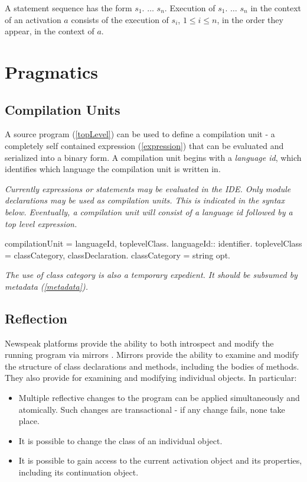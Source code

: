 \documentclass{article}
\begin{document}
A statement sequence has the form $s_1.$ $\ldots$ $ s_n$. Execution of  $s_1.$ $\ldots$ $ s_n$ in the context of an activation $a$  consists of the execution of $s_i$,  $1 \le i \le n$, in the order they appear,  in the context of $a$. 

\section{Pragmatics}

\subsection{Compilation Units}

A source program  (\ref{topLevel}) can be used to define a compilation unit - a completely self contained expression  (\ref{expression})  that can be evaluated and serialized into a binary form. A compilation unit begins with a {\em language id}, which identifies which language the compilation unit is written in.

{\it
Currently expressions or statements may be evaluated in the IDE. Only module declarations may be used as compilation units. This is indicated in the syntax below. Eventually, a compilation unit will consist of a language id followed by a top level expression.
}

\begin{newspeak}
compilationUnit =  languageId, toplevelClass.
languageId:: identifier.
toplevelClass = classCategory, classDeclaration.
classCategory = string opt.
\end{newspeak}

{\it
The use of class category is also a temporary expedient. It should be subsumed by metadata (\ref{metadata}).
}

\subsection{Reflection}
\label{reflect}

Newspeak platforms provide the ability to both introspect and modify the running program via mirrors \cite{bracha-ungar04}.  Mirrors provide the ability to examine and modify the structure of class declarations and methods, including the bodies of methods. They also provide for examining and modifying individual objects. In particular: 
\begin{itemize}
\item Multiple reflective changes to the program can be applied simultaneously and atomically. Such changes are transactional - if any change fails, none take place.
\item It is possible to change the class of an individual object. 
\item It is possible to gain access to the current activation object and its properties, including its continuation object.
\end{itemize}
\end{document}
